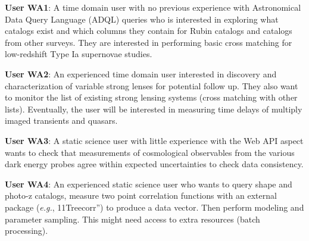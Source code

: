 {\bf User WA1}: A time domain user with no previous experience with Astronomical Data Query Language (ADQL) queries who is interested in exploring what catalogs exist and which columns they contain for Rubin catalogs and catalogs from other surveys. They are interested in performing basic cross matching for low-redshift Type Ia supernovae studies. 

{\bf User WA2}: An experienced time domain user interested in discovery and characterization of variable strong lenses for potential follow up. They also want to monitor the list of existing strong lensing systems (cross matching with other lists). Eventually, the user will be interested in measuring time delays of multiply imaged transients and quasars. 

{\bf User WA3}: A static science user with little experience with the Web API aspect wants to check that measurements of cosmological observables from the various dark energy probes agree within expected uncertainties to check data consistency. 

{\bf User WA4}: An experienced static science user who wants to query shape and photo-z catalogs, measure two point correlation functions with an external package (\emph{e.g.}, 11Treecorr”) to produce a data vector. Then perform modeling and parameter sampling. This might need access to extra resources (batch processing).
